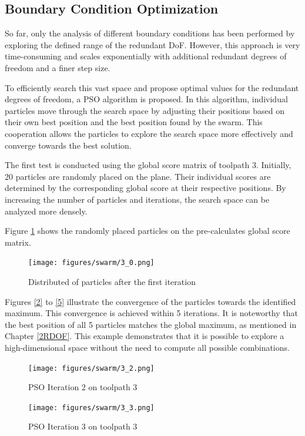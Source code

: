 \newpage
\subsection{Boundary Condition Optimization }
So far, only the analysis of different boundary conditions has been performed by exploring the defined range of the redundant DoF. However, this approach is very time-consuming and scales exponentially with additional redundant degrees of freedom and a finer step size.

To efficiently search this vast space and propose optimal values for the redundant degrees of freedom, a \acrshort{PSO} algorithm is proposed. In this algorithm, individual particles move through the search space by adjusting their positions based on their own best position and the best position found by the swarm. This cooperation allows the particles to explore the search space more effectively and converge towards the best solution.

The first test is conducted using the global score matrix of toolpath 3. Initially, 20 particles are randomly placed on the plane. Their individual scores are determined by the corresponding global score at their respective positions. By increasing the number of particles and iterations, the search space can be analyzed more densely.

Figure \ref{PSO_1} shows the randomly placed particles on the pre-calculates global score matrix.

\begin{figure}[H]
	\centerline{\texttt{[image: figures/swarm/3\_0.png]}}
	\caption{Distributed of particles after the first iteration}
	\label{PSO_1}
\end{figure}


\newpage
Figures \ref{2} to \ref{5} illustrate the convergence of the particles towards the identified maximum. This convergence is achieved within 5 iterations. It is noteworthy that the best position of all 5 particles matches the global maximum, as mentioned in Chapter \ref{2RDOF}. This example demonstrates that it is possible to explore a high-dimensional space without the need to compute all possible combinations.


\begin{figure}[H]
	\centering
	\begin{minipage}{0.5\textwidth}
		\texttt{[image: figures/swarm/3\_2.png]}
		\caption{PSO Iteration 2 on toolpath 3}
		\label{2}
	\end{minipage}\hfill
	\begin{minipage}{0.5\textwidth}
		\texttt{[image: figures/swarm/3\_3.png]}
		\caption{PSO Iteration 3 on toolpath 3}
		\label{3}
	\end{minipage}\par
\end{figure}	



